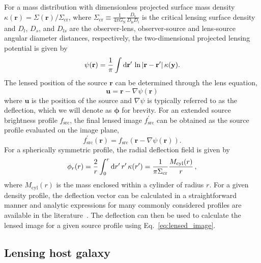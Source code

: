 \documentclass[twocolumn]{aastex62}
\begin{document}
For a mass distribution with dimensionless projected surface mass density $\kappa(\mathbf{r})=\Sigma(\mathbf{r}) / \Sigma_{\mathrm{cr}}$, where $\Sigma_{\mathrm{cr}}\equiv \frac{1}{4 \pi G_\mathrm{N}} \frac{D_{\mathrm{s}}}{D_{\mathrm{ls}} D_{\mathrm{l}}}$ is the critical lensing surface density and $D_l$, $D_s$, and $D_{ls}$ are the observer-lens, observer-source and lens-source angular diameter distances, respectively, the two-dimensional projected lensing potential is given by~\citep{1992grle.book.....S}
\begin{equation}
\psi(\mathbf{r})=\frac{1}{\pi} \int \diff \mathbf{r^\prime}\,\ln |\mathbf{r}-\mathbf{r^\prime}|\,\kappa(\mathbf{y}) .
\end{equation}
The lensed position of the source $\mathbf{r}$ can be determined through the lens equation,
\begin{equation}
\mathbf{u}=\mathbf{r}-\nabla \psi(\mathbf{r})
\end{equation}
where $\mathbf{u}$ is the position of the source and $\nabla \psi$ is typically referred to as the deflection, which we will denote as $\boldsymbol\phi$ for brevity. For an extended source brightness profile $f_\mathrm{src}$, the final lensed image $f^\prime_\mathrm{src}$ can be obtained as the source profile evaluated on the image plane,
\begin{equation}
f^\prime_\mathrm{src}(\mathbf r) = f_\mathrm{src}\left(\mathbf{r}-\nabla \psi(\mathbf{r})\right).
\label{eq:lensed_image}
\end{equation}
For a spherically symmetric profile, the radial deflection field is given by~\citep{2001astro.ph..2341K}
\begin{equation}
\phi_{r}(r)=\frac{2}{r} \int_{0}^{r}\diff r^\prime\,r^\prime\,\kappa(r^\prime) =\frac{1}{\pi \Sigma_{\mathrm{cr}}} \frac{M_{\mathrm{cyl}}(r)}{r} \,,
\end{equation}
where $M_{\mathrm{cyl}}(r)$ is the mass enclosed within a cylinder of radius $r$. For a given density profile, the deflection vector can be calculated in a straightforward manner and analytic expressions for many commonly considered profiles are available in the literature~\citep{2001astro.ph..2341K}. The deflection can then be used to calculate the lensed image for a given source profile using Eq.~\eqref{eq:lensed_image}.

\subsection{Lensing host galaxy}
\end{document}
